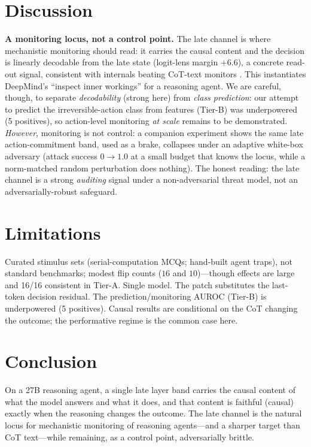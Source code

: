 \documentclass[11pt]{article}
\begin{document}
\section{Discussion}\label{sec:disc}
\textbf{A monitoring locus, not a control point.} The late channel is where mechanistic monitoring should read:
it carries the causal content and the decision is linearly decodable from the late state (logit-lens margin
$+6.6$), a concrete read-out signal, consistent with internals beating CoT-text monitors
\cite{mirtaheri2026,goodfire2026}. This instantiates DeepMind's ``inspect inner workings'' \cite{deepmind2026}
for a reasoning agent. We are careful, though, to separate \emph{decodability} (strong here) from
\emph{class prediction}: our attempt to predict the irreversible-action class from features (Tier-B) was
underpowered (5 positives), so action-level monitoring \emph{at scale} remains to be demonstrated.
\emph{However}, monitoring is not control: a companion experiment shows the same late
action-commitment band, used as a brake, collapses under an adaptive white-box adversary (attack success
$0\to1.0$ at a small budget that knows the locus, while a norm-matched random perturbation does nothing). The
honest reading: the late channel is a strong \emph{auditing} signal under a non-adversarial threat model, not an
adversarially-robust safeguard.

\section{Limitations}\label{sec:lim}
Curated stimulus sets (serial-computation MCQs; hand-built agent traps), not standard benchmarks; modest flip
counts ($16$ and $10$)---though effects are large and 16/16 consistent in Tier-A. Single model. The patch
substitutes the last-token decision residual. The prediction/monitoring AUROC (Tier-B) is underpowered
(5 positives). Causal results are conditional on the CoT changing the outcome; the performative regime is the
common case here.

\section{Conclusion}
On a 27B reasoning agent, a single late layer band carries the causal content of what the model answers and
what it does, and that content is faithful (causal) exactly when the reasoning changes the outcome. The late
channel is the natural locus for mechanistic monitoring of reasoning agents---and a sharper target than CoT
text---while remaining, as a control point, adversarially brittle.
\end{document}
